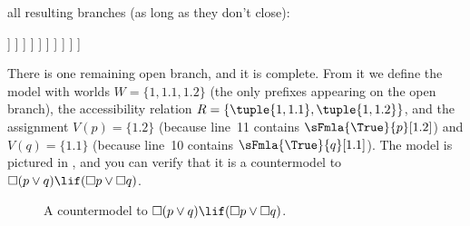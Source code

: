 \documentclass[../../../include/open-logic-section]{subfiles}
\begin{document}
{\begin{ex}
  all resulting branches (as long as they don't close):
  \begin{oltableau}
    [\pFmla{\False}{\Box(p \lor q) \lif (\Box p \lor \Box q)}{1},
      just = \TAss, checked
      [\pFmla{\True}{\Box(p \lor q)}{1},
        just = {\TRule{\False}{\lif}[1]}, 
        [\pFmla{\False}{\Box p \lor \Box q}{1},
          just = {\TRule{\False}{\lif}[1]}, checked
          [\pFmla{\False}{\Box p}{1},
            just = {\TRule{\False}{\lor}[3]}, checked
            [\pFmla{\False}{\Box q}{1},
              just = {\TRule{\False}{\lor}[3]}, checked
              [\pFmla{\False}{p}{1.1}, 
                just = {\TRule{\False}{\Box}[4]}, checked
                [\pFmla{\False}{q}{1.2}, 
                  just = {\TRule{\False}{\Box}[5]}, checked
                  [\pFmla{\True}{p \lor q}{1.1}, 
                    just = {\TRule{\True}{\Box}[2]}, checked
                    [\pFmla{\True}{p \lor q}{1.2}, 
                      just = {\TRule{\True}{\Box}[2]}, checked
                      [\pFmla{\True}{p}{1.1},
                        just = {\TRule{\True}{\lor}[8]}, checked, close
                      ]
                      [\pFmla{\True}{q}{1.1},
                        just = {\TRule{\True}{\lor}[8]}, checked
                        [\pFmla{\True}{p}{1.2},
                          just = {\TRule{\True}{\lor}[9]}, checked]
                        [\pFmla{\True}{q}{1.2},
                          just = {\TRule{\True}{\lor}[9]}, checked, close]
                      ]
                    ]
                  ]
                ]
              ]
            ]
          ]
        ]
      ]
    ]
  \end{oltableau}
  There is one remaining open branch, and it is complete. From it we
  define the model with worlds $W = \{1, 1.1, 1.2\}$ (the only
  prefixes appearing on the open branch), the accessibility relation
  $R = \{\tuple{1, 1.1}, \tuple{1, 1.2}\}$, and the assignment $V(p) =
  \{1.2\}$ (because line~11 contains $\sFmla{\True}{p}[1.2]$) and
  $V(q) = \{1.1\}$ (because line~10 contains
  $\sFmla{\True}{q}[1.1]$). The model is pictured in
  , and you can verify that it is a
  countermodel to $\Box(p \lor q) \lif (\Box p \lor \Box q)$.
  \begin{figure}
  \centering
  \caption{A countermodel to $\Box(p \lor q) \lif (\Box p \lor \Box
    q)$.}
\end{figure}
\end{ex}          
}
\end{document}
